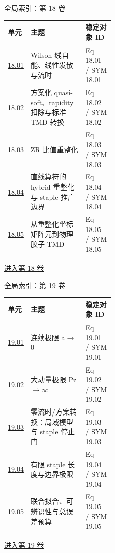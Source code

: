 \documentclass[aspectratio=169,10pt]{ctexbeamer}
\begin{document}
\begin{frame}[t]{全局索引：第 18 卷}
\small\begin{tabularx}{\linewidth}{p{0.15\linewidth}Yp{0.27\linewidth}}
\toprule 单元 & 主题 & 稳定对象 ID\\\midrule
\hyperlink{Fr:18.01-1}{18.01} & Wilson 线自能、线性发散与流时 & Eq 18.01 / SYM 18.01\\
\hyperlink{Fr:18.02-1}{18.02} & 方案化 quasi-soft、rapidity 扣除与标准 TMD 转换 & Eq 18.02 / SYM 18.02\\
\hyperlink{Fr:18.03-1}{18.03} & ZR 比值重整化 & Eq 18.03 / SYM 18.03\\
\hyperlink{Fr:18.04-1}{18.04} & 直线算符的 hybrid 重整化与 staple 推广边界 & Eq 18.04 / SYM 18.04\\
\hyperlink{Fr:18.05-1}{18.05} & 从重整化坐标矩阵元到物理胶子 TMD & Eq 18.05 / SYM 18.05\\
\bottomrule\end{tabularx}
\vfill\hyperlink{Fr:V18-title}{进入第 18 卷}
\end{frame}

\begin{frame}[t]{全局索引：第 19 卷}
\small\begin{tabularx}{\linewidth}{p{0.15\linewidth}Yp{0.27\linewidth}}
\toprule 单元 & 主题 & 稳定对象 ID\\\midrule
\hyperlink{Fr:19.01-1}{19.01} & 连续极限 a\ensuremath{\rightarrow}0 & Eq 19.01 / SYM 19.01\\
\hyperlink{Fr:19.02-1}{19.02} & 大动量极限 Pz\ensuremath{\rightarrow}\ensuremath{\infty} & Eq 19.02 / SYM 19.02\\
\hyperlink{Fr:19.03-1}{19.03} & 零流时/\allowbreak{}方案转换：局域模型与 staple 停止门 & Eq 19.03 / SYM 19.03\\
\hyperlink{Fr:19.04-1}{19.04} & 有限 staple 长度与边界极限 & Eq 19.04 / SYM 19.04\\
\hyperlink{Fr:19.05-1}{19.05} & 联合拟合、可辨识性与总误差预算 & Eq 19.05 / SYM 19.05\\
\bottomrule\end{tabularx}
\vfill\hyperlink{Fr:V19-title}{进入第 19 卷}
\end{frame}
\end{document}
